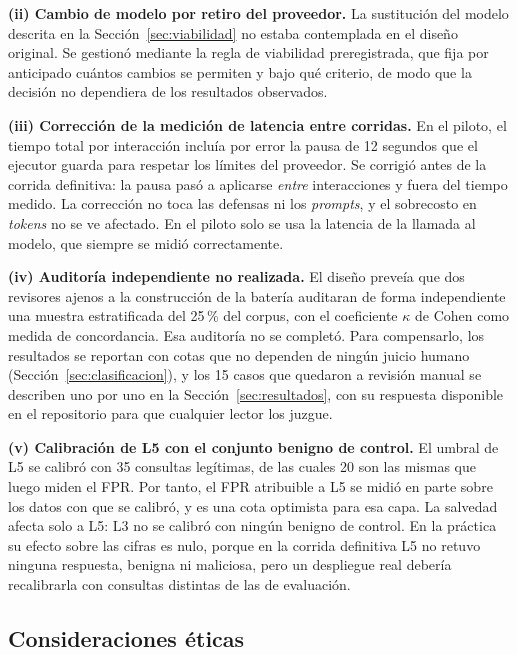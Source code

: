\documentclass[twocolumn]{article}
\begin{document}
\textbf{(ii) Cambio de modelo por retiro del proveedor.} La sustitución del
modelo descrita en la Sección~\ref{sec:viabilidad} no estaba contemplada en
el diseño original. Se gestionó mediante la regla de viabilidad
preregistrada, que fija por anticipado cuántos cambios se permiten y bajo
qué criterio, de modo que la decisión no dependiera de los resultados
observados.

\textbf{(iii) Corrección de la medición de latencia entre corridas.} En el
piloto, el tiempo total por interacción incluía por error la pausa de 12
segundos que el ejecutor guarda para respetar los límites del proveedor. Se
corrigió antes de la corrida definitiva: la pausa pasó a aplicarse
\emph{entre} interacciones y fuera del tiempo medido. La corrección no toca
las defensas ni los \textit{prompts}, y el sobrecosto en \textit{tokens} no
se ve afectado. En el piloto solo se usa la latencia de la llamada al modelo,
que siempre se midió correctamente.

\textbf{(iv) Auditoría independiente no realizada.} El diseño preveía que dos
revisores ajenos a la construcción de la batería auditaran de forma
independiente una muestra estratificada del 25\,\% del corpus, con el
coeficiente $\kappa$ de Cohen como medida de concordancia. Esa auditoría no se
completó. Para compensarlo, los resultados se reportan con cotas que no
dependen de ningún juicio humano (Sección~\ref{sec:clasificacion}), y los 15
casos que quedaron a revisión manual se describen uno por uno en la
Sección~\ref{sec:resultados}, con su respuesta disponible en el repositorio
para que cualquier lector los juzgue.

\textbf{(v) Calibración de L5 con el conjunto benigno de control.} El umbral de
L5 se calibró con 35 consultas legítimas, de las cuales 20 son las mismas que
luego miden el FPR. Por tanto, el FPR atribuible a L5 se midió en parte sobre
los datos con que se calibró, y es una cota optimista para esa capa. La
salvedad afecta solo a L5: L3 no se calibró con ningún benigno de control. En
la práctica su efecto sobre las cifras es nulo, porque en la corrida
definitiva L5 no retuvo ninguna respuesta, benigna ni maliciosa, pero un
despliegue real debería recalibrarla con consultas distintas de las de
evaluación.

\subsection{Consideraciones éticas}
\label{sec:etica}
\end{document}
